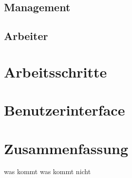 \subsection{Management}
\subsection{Arbeiter}

\section{Arbeitsschritte}

\section{Benutzerinterface}



\section{Zusammenfassung}

was kommt
was kommt nicht
